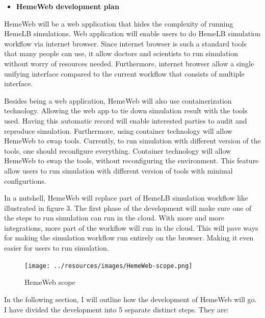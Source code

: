 \documentclass[]{article}
\providecommand{\tightlist}{%
  \setlength{\itemsep}{0pt}\setlength{\parskip}{0pt}}
\begin{document}
\begin{itemize}
\tightlist
\item
  \textbf{HemeWeb development plan}
\end{itemize}

HemeWeb will be a web application that hides the complexity of running
HemeLB simulations. Web application will enable users to do HemeLB
simulation workflow via internet browser. Since internet browser is such
a standard tools that many people can use, it allow doctors and
scientists to run simulation without worry of resources needed.
Furthermore, internet browser allow a single unifying interface compared
to the current workflow that consists of multiple interface.

Besides being a web application, HemeWeb will also use containerization
technology. Allowing the web app to tie down simulation result with the
tools used. Having this automatic record will enable interested parties
to audit and reproduce simulation. Furthermore, using container
technology will allow HemeWeb to swap tools. Currently, to run
simulation with different version of the tools, one should reconfigure
everything. Container technology will allow HemeWeb to swap the tools,
without reconfiguring the environment. This feature allow users to run
simulation with different version of tools with minimal configurtions.

In a nutshell, HemeWeb will replace part of HemeLB simulation workflow
like illustrated in figure 3. The first phase of the development will
make sure one of the steps to run simulation can run in the cloud. With
more and more integrations, more part of the workflow will run in the
cloud. This will pave ways for making the simulation workflow run
entirely on the browser. Making it even easier for users to run
simulation.

\begin{figure}[H]
\centering
\texttt{[image: ../resources/images/HemeWeb-scope.png]}
\caption{HemeWeb scope}
\end{figure}

In the following section, I will outline how the development of HemeWeb
will go. I have divided the development into 5 separate distinct steps.
They are:
\end{document}
